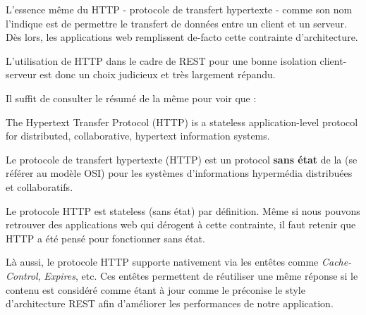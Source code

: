 \documentclass[big]{zmdocument}
\begin{document}


L'essence même du HTTP - protocole de transfert hypertexte - comme son nom l'indique est de permettre le transfert de données entre un client et un serveur. Dès lors, les applications web remplissent de-facto cette contrainte d'architecture.



L'utilisation de HTTP dans le cadre de REST pour une bonne isolation client-serveur est donc un choix judicieux et très largement répandu.





Il suffit de consulter le résumé de la même  pour voir que :



\begin{Quotation}
The Hypertext Transfer Protocol (HTTP) is a stateless application-level protocol for distributed, collaborative, hypertext information systems.
\end{Quotation}



Le protocole de transfert hypertexte (HTTP) est un protocol \textbf{sans état} de la  (se référer au modèle OSI) pour les systèmes d'informations hypermédia distribuées et collaboratifs.



Le protocole HTTP est stateless (sans état) par définition. Même si nous pouvons retrouver des applications web qui dérogent à cette contrainte, il faut retenir que HTTP a été pensé pour fonctionner sans état.





Là aussi, le protocole HTTP supporte nativement  via les entêtes comme \textit{Cache-Control}, \textit{Expires}, etc.
Ces entêtes permettent de réutiliser une même réponse si le contenu est considéré comme étant à jour comme le préconise le style d'architecture REST afin d'améliorer les performances de notre application.





\end{document}
